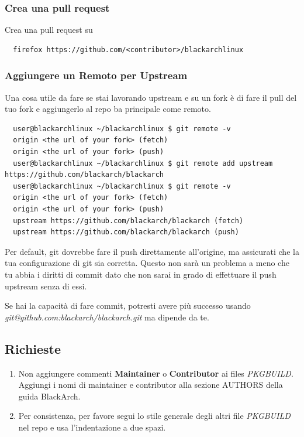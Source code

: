 \documentclass[a4paper, oneside, 11pt]{book}
\def\href#1#2{\htmladdnormallink{#2}{#1}}
\begin{document}
\subsubsection{Crea una pull request}
Crea una pull request su \href{https://github.com/}{github.com}
\begin{lstlisting}
  firefox https://github.com/<contributor>/blackarchlinux
\end{lstlisting}

\subsubsection{Aggiungere un Remoto per Upstream}
Una cosa utile da fare se stai lavorando upstream e su un fork è di fare il pull del tuo fork e aggiungerlo al repo ba principale come remoto.

\begin{lstlisting}
  user@blackarchlinux ~/blackarchlinux $ git remote -v
  origin <the url of your fork> (fetch)
  origin <the url of your fork> (push)
  user@blackarchlinux ~/blackarchlinux $ git remote add upstream https://github.com/blackarch/blackarch
  user@blackarchlinux ~/blackarchlinux $ git remote -v
  origin <the url of your fork> (fetch)
  origin <the url of your fork> (push)
  upstream https://github.com/blackarch/blackarch (fetch)
  upstream https://github.com/blackarch/blackarch (push)
\end{lstlisting}

Per default, git dovrebbe fare il push direttamente all'origine, ma assicurati che la tua configurazione di git sia corretta.
Questo non sarà un problema a meno che tu abbia i diritti di commit dato che non sarai in grado di effettuare il push upstream senza di essi.

Se hai la capacità di fare commit, potresti avere più successo usando
\textit{git@github.com:blackarch/blackarch.git} ma dipende da te.

\subsection{Richieste}
\begin{enumerate}
\item Non aggiungere commenti \textbf{Maintainer} o \textbf{Contributor} ai files
\textit{PKGBUILD}. Aggiungi i nomi di maintainer e contributor alla sezione
AUTHORS della guida BlackArch.
\item Per consistenza, per favore segui lo stile generale degli altri file \textit{PKGBUILD} nel repo e usa l'indentazione a due spazi.
\end{enumerate}
\end{document}
